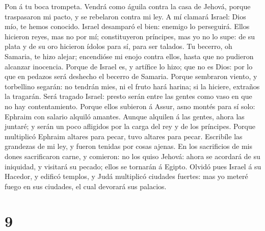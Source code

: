  Pon á tu boca trompeta. Vendrá como águila contra la casa
de Jehová, porque traspasaron mi pacto, y se rebelaron contra mi ley.
 A mí clamará Israel: Dios mío, te hemos conocido.
 Israel desamparó el bien: enemigo lo perseguirá.
 Ellos hicieron reyes, mas no por mí; constituyeron
príncipes, mas yo no lo supe: de su plata y de su oro hicieron ídolos
para sí, para ser talados.  Tu becerro, oh Samaria, te
hizo alejar; encendióse mi enojo contra ellos, hasta que no pudieron
alcanzar inocencia.  Porque de Israel es, y artífice lo
hizo; que no es Dios: por lo que en pedazos será deshecho el becerro de
Samaria.  Porque sembraron viento, y torbellino segarán:
no tendrán mies, ni el fruto hará harina; si la hiciere, extraños la
tragarán.  Será tragado Israel: presto serán entre las
gentes como vaso en que no hay contentamiento.  Porque
ellos subieron á Assur, asno montés para sí solo: Ephraim con salario
alquiló amantes.  Aunque alquilen á las gentes, ahora las
juntaré; y serán un poco afligidos por la carga del rey y de los
príncipes.  Porque multiplicó Ephraim altares para pecar,
tuvo altares para pecar.  Escribíle las grandezas de mi
ley, y fueron tenidas por cosas ajenas.  En los
sacrificios de mis dones sacrificaron carne, y comieron: no los quiso
Jehová: ahora se acordará de su iniquidad, y visitará su pecado; ellos
se tornarán á Egipto.  Olvidó pues Israel á su Hacedor, y
edificó templos, y Judá multiplicó ciudades fuertes: mas yo meteré fuego
en sus ciudades, el cual devorará sus palacios.

\hypertarget{section-8}{%
\section{9}\label{section-8}}

